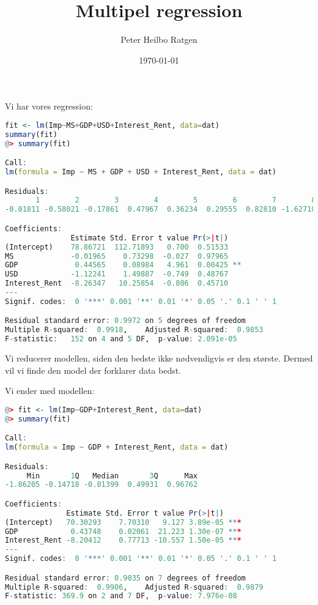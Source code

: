 \documentclass{article}
\title{Multipel regression}
\author{Peter Heilbo Ratgen}
\date{\today}
\begin{document}
\maketitle

Vi har vores regression:
\begin{lstlisting}[basicstyle=\ttfamily, language=R, keywordstyle=\color{blue}\bfseries, rulecolor=\color{black}]
fit <- lm(Imp~MS+GDP+USD+Interest_Rent, data=dat)
summary(fit)
@> summary(fit)

Call:
lm(formula = Imp ~ MS + GDP + USD + Interest_Rent, data = dat)

Residuals:
       1        2        3        4        5        6        7        8        9       10
-0.01811 -0.58021 -0.17861  0.47967  0.36234  0.29555  0.82810 -1.62710  0.82139 -0.38302

Coefficients:
               Estimate Std. Error t value Pr(>|t|)
(Intercept)    78.86721  112.71893   0.700  0.51533
MS             -0.01965    0.73298  -0.027  0.97965
GDP             0.44565    0.08984   4.961  0.00425 **
USD            -1.12241    1.49887  -0.749  0.48767
Interest_Rent  -8.26347   10.25854  -0.806  0.45710
---
Signif. codes:  0 '***' 0.001 '**' 0.01 '*' 0.05 '.' 0.1 ' ' 1

Residual standard error: 0.9972 on 5 degrees of freedom
Multiple R-squared:  0.9918,    Adjusted R-squared:  0.9853
F-statistic:   152 on 4 and 5 DF,  p-value: 2.091e-05
\end{lstlisting}

Vi reducerer modellen, siden den bedste ikke nødvendigvis er den største. Dermed
vil vi finde den model der forklarer data bedst.

Vi ender med modellen:
\begin{lstlisting}[inputencoding=utf8/latin1,basicstyle=\ttfamily, language=R, keywordstyle=\color{blue}\bfseries, rulecolor=\color{black}]
@> fit <- lm(Imp~GDP+Interest_Rent, data=dat)
@> summary(fit)

Call:
lm(formula = Imp ~ GDP + Interest_Rent, data = dat)

Residuals:
     Min       1Q   Median       3Q      Max
-1.86205 -0.14718 -0.01399  0.49931  0.96762

Coefficients:
              Estimate Std. Error t value Pr(>|t|)
(Intercept)   70.30293    7.70310   9.127 3.89e-05 ***
GDP            0.43748    0.02061  21.223 1.30e-07 ***
Interest_Rent -8.20412    0.77713 -10.557 1.50e-05 ***
---
Signif. codes:  0 '***' 0.001 '**' 0.01 '*' 0.05 '.' 0.1 ' ' 1

Residual standard error: 0.9035 on 7 degrees of freedom
Multiple R-squared:  0.9906,    Adjusted R-squared:  0.9879
F-statistic: 369.9 on 2 and 7 DF,  p-value: 7.976e-08
\end{lstlisting}
\end{document}
